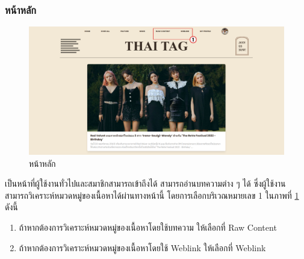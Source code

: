 \documentclass[12pt,oneside,openright,a4paper]{cpe-thai-project}
\begin{document}
\begin{itemize}
        \subsubsection{หน้าหลัก}
          \begin{figure}[!ht]\centering
            \includegraphics[width=\textwidth]{./img/project_ui/4_4.png}
            \caption{หน้าหลัก}\label{fig:exp_home}
          \end{figure}
          \hspace{1cm}เป็นหน้าที่ผู้ใช้งานทั่วไปและสมาชิกสามารถเข้าถึงได้ สามารถอ่านบทความต่าง ๆ ได้ ซึ่งผู้ใช้งานสามารถวิเคราะห์หมวดหมู่ของเนื้อหาได้ผ่านทางหน้านี้
          โดยการเลือกบริเวณหมายเลข 1 ในภาพที่ \ref{fig:exp_home} ดังนี้
          \begin{enumerate}
            \item ถ้าหากต้องการวิเคราะห์หมวดหมู่ของเนื้อหาโดยใช้บทความ ให้เลือกที่ Raw Content
            \item ถ้าหากต้องการวิเคราะห์หมวดหมู่ของเนื้อหาโดยใช้ Weblink ให้เลือกที่ Weblink
          \end{enumerate}


\end{itemize}
\end{document}
